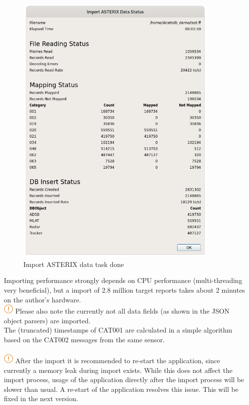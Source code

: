 \begin{figure}[H]
  \center
    \includegraphics[width=10cm]{../screenshots/asterix_import_done.png}
  \caption{Import ASTERIX data task done}
\end{figure}

Importing performance strongly depends on CPU performance (multi-threading very beneficial), but a import of 2.8 million target reports takes about 2 minutes on the author's hardware. \\

\includegraphics[width=0.5cm]{../../data/icons/hint.png} Please also note the currently not all data fields (as shown in the JSON object parsers) are imported.\\

The (truncated) timestamps of CAT001 are calculated in a simple algorithm based on the CAT002 messages from the same sensor. \\\\

\includegraphics[width=0.5cm]{../../data/icons/hint.png} After the import it is recommended to re-start the application, since currently a memory leak during import exists. While this does not affect the import process, usage of the application directly after the import process will be slower than usual. A re-start of the application resolves this issue. This will be fixed in the next version. \\ 
